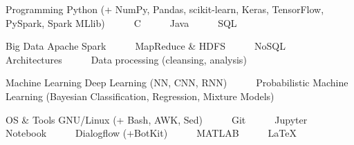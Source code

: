 

\begin{cvskills}

  \cvskill
    {Programming} %
    {Python (+ NumPy, Pandas, scikit-learn, Keras, TensorFlow, PySpark, Spark MLlib)~~~\textbullet~~~C~~~\textbullet~~~Java~~~\textbullet~~~SQL} %

  \cvskill
    {Big Data} %
    {Apache Spark~~~\textbullet~~~MapReduce \& HDFS~~~\textbullet~~~NoSQL Architectures~~~\textbullet~~~Data processing (cleansing, analysis)} %

  \cvskill
    {Machine Learning} %
    {Deep Learning (NN, CNN, RNN)~~~\textbullet~~~Probabilistic Machine Learning (Bayesian Classification, Regression, Mixture Models)} %

  \cvskill
    {OS \& Tools} %
    {GNU/Linux (+ Bash, AWK, Sed)~~~\textbullet~~~Git~~~\textbullet~~~Jupyter Notebook~~~\textbullet~~~Dialogflow (+BotKit)~~~\textbullet~~~MATLAB~~~\textbullet~~~LaTeX} %

\end{cvskills}

